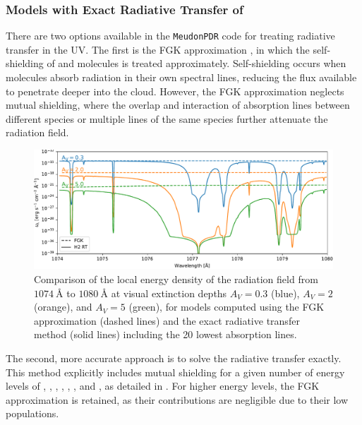 \documentclass[12pt,a4paper]{article}
\newcommand{\mdpdr}{\texttt{MeudonPDR} code}
\begin{document}
\subsubsection{Models with Exact Radiative Transfer of \texorpdfstring{}{H2}} \label{sec:exactrt}

There are two options available in the \mdpdr{} for treating radiative transfer in the UV. The first is the FGK approximation \parencite{Federman1979}, in which the self-shielding of  and  molecules is treated approximately. Self-shielding occurs when molecules absorb radiation in their own spectral lines, reducing the flux available to penetrate deeper into the cloud. However, the FGK approximation neglects mutual shielding, where the overlap and interaction of absorption lines between different species or multiple lines of the same species further attenuate the radiation field.

\begin{figure}[h]
    \centering
    \includegraphics[width=.92\textwidth,keepaspectratio]{spectra_fgkh2_1.pdf}
    \caption{Comparison of the local energy density of the radiation field from $1074~\text{\AA}$ to $1080~\text{\AA}$ at visual extinction depths $A_V = 0.3$ (blue), $A_V = 2$ (orange), and $A_V = 5$ (green), for models computed using the FGK approximation (dashed lines) and the exact radiative transfer method (solid lines) including the 20 lowest  absorption lines.} \label{fig:cmpH2rtspectra}
\end{figure}

The second, more accurate approach is to solve the radiative transfer exactly. This method explicitly includes mutual shielding for a given number of energy levels of , , , , , , and , as detailed in \textcite{Goicoechea2007,Gonzalez2008}. For higher energy levels, the FGK approximation is retained, as their contributions are negligible due to their low populations.
\end{document}
